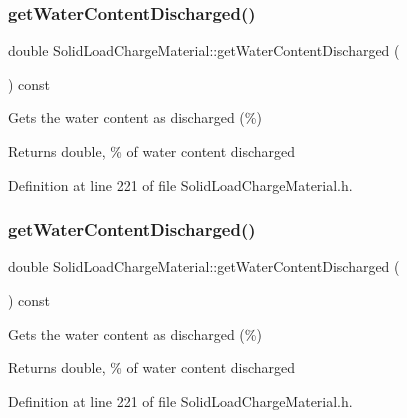 \subsubsection{\texorpdfstring{get\+Water\+Content\+Discharged()}{getWaterContentDischarged()}\hspace{0.1cm}{\footnotesize\ttfamily [1/3]}}
{\footnotesize\ttfamily double Solid\+Load\+Charge\+Material\+::get\+Water\+Content\+Discharged (\begin{DoxyParamCaption}{ }\end{DoxyParamCaption}) const\hspace{0.3cm}{\ttfamily [inline]}}

Gets the water content as discharged (\%) \begin{DoxyReturn}{Returns}
double, \% of water content discharged 
\end{DoxyReturn}


Definition at line 221 of file Solid\+Load\+Charge\+Material.\+h.

\mbox{\label{class_solid_load_charge_material_aeeb6b341a6b5770155b85264dabbd1a7}} 
\subsubsection{\texorpdfstring{get\+Water\+Content\+Discharged()}{getWaterContentDischarged()}\hspace{0.1cm}{\footnotesize\ttfamily [2/3]}}
{\footnotesize\ttfamily double Solid\+Load\+Charge\+Material\+::get\+Water\+Content\+Discharged (\begin{DoxyParamCaption}{ }\end{DoxyParamCaption}) const\hspace{0.3cm}{\ttfamily [inline]}}

Gets the water content as discharged (\%) \begin{DoxyReturn}{Returns}
double, \% of water content discharged 
\end{DoxyReturn}


Definition at line 221 of file Solid\+Load\+Charge\+Material.\+h.

\mbox{\label{class_solid_load_charge_material_aeeb6b341a6b5770155b85264dabbd1a7}} 
